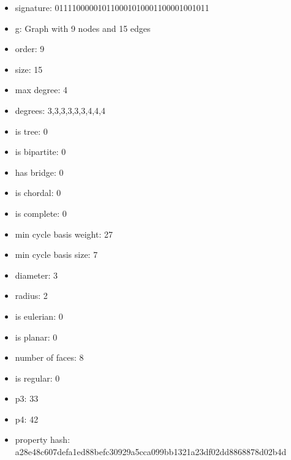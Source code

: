 \begin{figure}
\end{figure}
\begin{itemize}
\item signature: 011110000010110001010001100001001011
\item g: Graph with 9 nodes and 15 edges
\item order: 9
\item size: 15
\item max degree: 4
\item degrees: 3,3,3,3,3,3,4,4,4
\item is tree: 0
\item is bipartite: 0
\item has bridge: 0
\item is chordal: 0
\item is complete: 0
\item min cycle basis weight: 27
\item min cycle basis size: 7
\item diameter: 3
\item radius: 2
\item is eulerian: 0
\item is planar: 0
\item number of faces: 8
\item is regular: 0
\item p3: 33
\item p4: 42
\item property hash: a28e48c607defa1ed88befc30929a5cca099bb1321a23df02dd8868878d02b4d
\end{itemize}
\newpage
